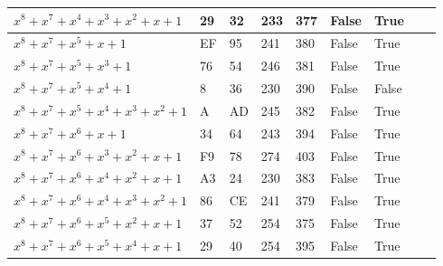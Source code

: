 \begin{footnotesize}
\begin{longtable}{|l|l|l|l|l|l|l|l|l|}
$x^8 + x^7 + x^4 + x^3 + x^2 + x + 1$   & 29            & 32                & 233                 & 377                   & False               & True              &              &                \\ \hline
$x^8 + x^7 + x^5 + x + 1$               & EF            & 95                & 241                 & 380                   & False               & True              &              &                \\ \hline
$x^8 + x^7 + x^5 + x^3 + 1$             & 76            & 54                & 246                 & 381                   & False               & True              &              &                \\ \hline
$x^8 + x^7 + x^5 + x^4 + 1$             & 8             & 36                & 230                 & 390                   & False               & False             &              &                \\ \hline
$x^8 + x^7 + x^5 + x^4 + x^3 + x^2 + 1$ & A             & AD                & 245                 & 382                   & False               & True              &              &                \\ \hline
$x^8 + x^7 + x^6 + x + 1$               & 34            & 64                & 243                 & 394                   & False               & True              &              &                \\ \hline
$x^8 + x^7 + x^6 + x^3 + x^2 + x + 1$   & F9            & 78                & 274                 & 403                   & False               & True              &              &                \\ \hline
$x^8 + x^7 + x^6 + x^4 + x^2 + x + 1$   & A3            & 24                & 230                 & 383                   & False               & True              &              &                \\ \hline
$x^8 + x^7 + x^6 + x^4 + x^3 + x^2 + 1$ & 86            & CE                & 241                 & 379                   & False               & True              &              &                \\ \hline
$x^8 + x^7 + x^6 + x^5 + x^2 + x + 1$   & 37            & 52                & 254                 & 375                   & False               & True              &              &                \\ \hline
$x^8 + x^7 + x^6 + x^5 + x^4 + x + 1$   & 29            & 40                & 254                 & 395                   & False               & True              &              &                \\ \hline

\end{longtable}
\end{footnotesize}
